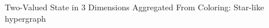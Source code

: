 \documentclass{beamer}
\begin{document}
\begin{frame}{Two-Valued State in 3 Dimensions Aggregated From Coloring: Star-like hypergraph}
    \begin{columns}[c] %
        \begin{column}{0.45\textwidth}
\end{column}
\end{columns}
\end{frame}
\end{document}
